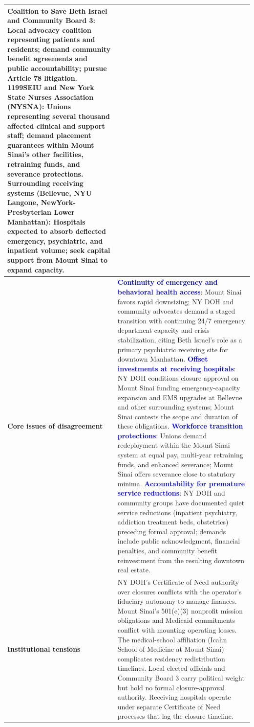 \begin{table}[p]
\begin{tabularx}{\textwidth}{@{}l X@{}}
\newline
\textbf{Coalition to Save Beth Israel and Community Board 3}: Local advocacy coalition representing patients and residents; demand community benefit agreements and public accountability; pursue Article 78 litigation.
\newline
\textbf{1199SEIU and New York State Nurses Association (NYSNA)}: Unions representing several thousand affected clinical and support staff; demand placement guarantees within Mount Sinai's other facilities, retraining funds, and severance protections.
\newline
\textbf{Surrounding receiving systems (Bellevue, NYU Langone, NewYork-Presbyterian Lower Manhattan)}: Hospitals expected to absorb deflected emergency, psychiatric, and inpatient volume; seek capital support from Mount Sinai to expand capacity. \\
\midrule
\textbf{Core issues of disagreement} &
\textcolor{blue}{\textbf{Continuity of emergency and behavioral health access}}: Mount Sinai favors rapid downsizing; NY DOH and community advocates demand a staged transition with continuing 24/7 emergency department capacity and crisis stabilization, citing Beth Israel's role as a primary psychiatric receiving site for downtown Manhattan.
\newline
\textcolor{blue}{\textbf{Offset investments at receiving hospitals}}: NY DOH conditions closure approval on Mount Sinai funding emergency-capacity expansion and EMS upgrades at Bellevue and other surrounding systems; Mount Sinai contests the scope and duration of these obligations.
\newline
\textcolor{blue}{\textbf{Workforce transition protections}}: Unions demand redeployment within the Mount Sinai system at equal pay, multi-year retraining funds, and enhanced severance; Mount Sinai offers severance close to statutory minima.
\newline
\textcolor{blue}{\textbf{Accountability for premature service reductions}}: NY DOH and community groups have documented quiet service reductions (inpatient psychiatry, addiction treatment beds, obstetrics) preceding formal approval; demands include public acknowledgment, financial penalties, and community benefit reinvestment from the resulting downtown real estate. \\
\midrule
\textbf{Institutional tensions} &
NY DOH's Certificate of Need authority over closures conflicts with the operator's fiduciary autonomy to manage finances. Mount Sinai's 501(c)(3) nonprofit mission obligations and Medicaid commitments conflict with mounting operating losses. The medical-school affiliation (Icahn School of Medicine at Mount Sinai) complicates residency redistribution timelines. Local elected officials and Community Board 3 carry political weight but hold no formal closure-approval authority. Receiving hospitals operate under separate Certificate of Need processes that lag the closure timeline. \\

\end{tabularx}
\end{table}
